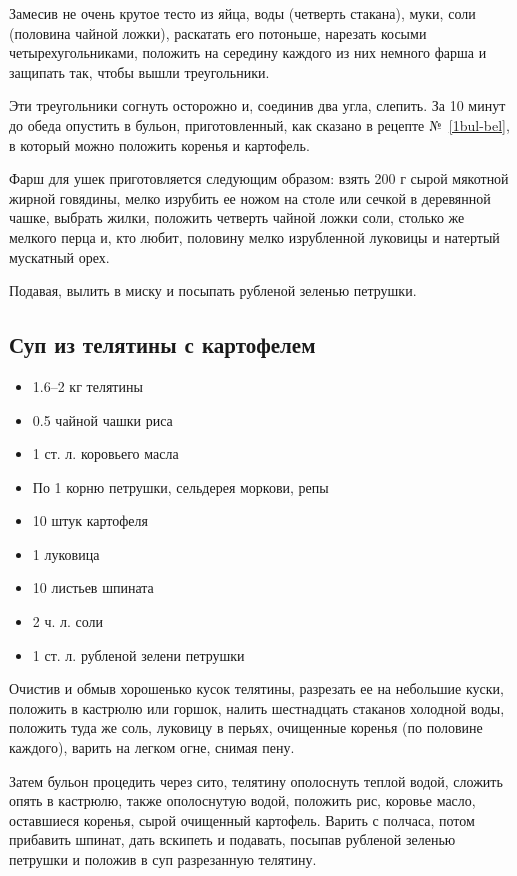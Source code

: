 Замесив не очень крутое тесто из яйца, воды (четверть стакана), муки, соли (половина чайной ложки), раскатать его потоньше, нарезать косыми четырехугольниками, положить на середину каждого из них немного фарша и защипать так, чтобы вышли треугольники.

Эти треугольники согнуть осторожно и, соединив два угла, слепить. За 10 минут до обеда опустить в бульон, приготовленный, как сказано в рецепте №~\ref{1bul-bel}, в который можно положить коренья и картофель.

Фарш для ушек приготовляется следующим образом: взять 200 г сырой мякотной жирной говядины, мелко изрубить ее ножом на столе или сечкой в деревянной чашке, выбрать жилки, положить четверть чайной ложки соли, столько же мелкого перца и, кто любит, половину мелко изрубленной луковицы и натертый мускатный орех.

Подавая, вылить в миску и посыпать рубленой зеленью петрушки.

\subsection{Суп из телятины с картофелем}\label{19sup-teliatina-kartof}

\begin{itemize}
	\item 1.6–2 кг телятины 
	\item 0.5 чайной чашки риса 
	\item 1 ст. л. коровьего масла 
	\item По 1 корню петрушки, сельдерея моркови, репы 
	\item 10 штук картофеля 
	\item 1 луковица 
	\item 10 листьев шпината 
	\item 2 ч. л. соли 
	\item 1 ст. л. рубленой зелени петрушки
\end{itemize}

Очистив и обмыв хорошенько кусок телятины, разрезать ее на небольшие куски, положить в кастрюлю или горшок, налить шестнадцать стаканов холодной воды, положить туда же соль, луковицу в перьях, очищенные коренья (по половине каждого), варить на легком огне, снимая пену.

Затем бульон процедить через сито, телятину ополоснуть теплой водой, сложить опять в кастрюлю, также ополоснутую водой, положить рис, коровье масло, оставшиеся коренья, сырой очищенный картофель. Варить с полчаса, потом прибавить шпинат, дать вскипеть и подавать, посыпав рубленой зеленью петрушки и положив в суп разрезанную телятину.

